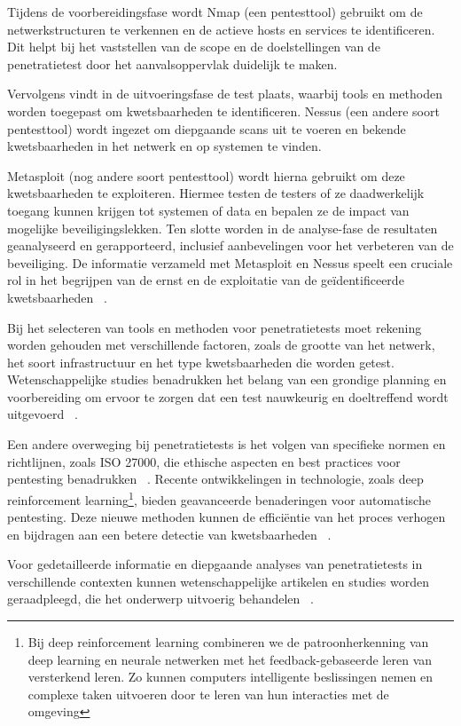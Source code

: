Tijdens de voorbereidingsfase wordt Nmap (een pentesttool) gebruikt om de netwerkstructuren te verkennen en de actieve hosts en 
services te identificeren. Dit helpt bij het vaststellen van de scope en de doelstellingen van de penetratietest 
door het aanvalsoppervlak duidelijk te maken. 

Vervolgens vindt in de uitvoeringsfase de test plaats, waarbij tools en methoden worden 
toegepast om kwetsbaarheden te identificeren. Nessus (een andere soort pentesttool) wordt ingezet om diepgaande scans uit te voeren en 
bekende kwetsbaarheden in het netwerk en op systemen te vinden. 

Metasploit (nog andere soort pentesttool) wordt hierna gebruikt om deze 
kwetsbaarheden te exploiteren. Hiermee testen de testers of ze daadwerkelijk toegang kunnen krijgen tot 
systemen of data en bepalen ze de impact van mogelijke beveiligingslekken. Ten slotte worden in de analyse-fase de resultaten 
geanalyseerd en gerapporteerd, inclusief aanbevelingen voor het verbeteren van de beveiliging. De 
informatie verzameld met Metasploit en Nessus speelt een cruciale rol in het begrijpen van de ernst en de 
exploitatie van de geïdentificeerde kwetsbaarheden ~\autocite{Sarker2023}.

Bij het selecteren van tools en methoden voor penetratietests moet rekening worden gehouden met verschillende factoren, zoals de 
grootte van het netwerk, het soort infrastructuur en het type kwetsbaarheden die worden getest. Wetenschappelijke studies 
benadrukken het belang van een grondige planning en voorbereiding om ervoor te zorgen dat een test nauwkeurig en doeltreffend 
wordt uitgevoerd ~\autocite{Alhamed2023}.

Een andere overweging bij penetratietests is het volgen van specifieke normen en richtlijnen, zoals ISO 27000, die ethische 
aspecten en best practices voor pentesting benadrukken ~\autocite{DalalanaBertoglio2017}. Recente ontwikkelingen in technologie, zoals deep 
reinforcement learning\footnote{Bij deep reinforcement learning combineren we de patroonherkenning van deep learning en neurale 
netwerken met het feedback-gebaseerde leren van versterkend leren. Zo kunnen computers intelligente beslissingen nemen en complexe 
taken uitvoeren door te leren van hun interacties met de omgeving}, bieden geavanceerde benaderingen voor automatische pentesting. 
Deze nieuwe methoden kunnen de efficiëntie van het proces verhogen en bijdragen aan een betere detectie van kwetsbaarheden 
~\autocite{Yi2023}.

Voor gedetailleerde informatie en diepgaande analyses van penetratietests in verschillende contexten kunnen wetenschappelijke 
artikelen en studies worden geraadpleegd, die het onderwerp uitvoerig behandelen ~\autocite{Sarker2023}.

